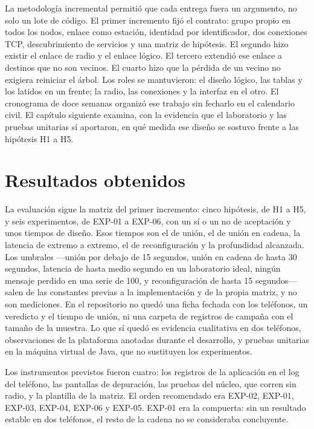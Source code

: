 \documentclass[12pt,oneside]{scrreprt}
\begin{document}
La metodología incremental permitió que cada entrega fuera un argumento, no solo un lote de código. El primer incremento fijó el contrato: grupo propio en todos los nodos, enlace como estación, identidad por identificador, dos conexiones TCP, descubrimiento de servicios y una matriz de hipótesis. El segundo hizo existir el enlace de radio y el enlace lógico. El tercero extendió ese enlace a destinos que no son vecinos. El cuarto hizo que la pérdida de un vecino no exigiera reiniciar el árbol. Los roles se mantuvieron: el diseño lógico, las tablas y los latidos en un frente; la radio, las conexiones y la interfaz en el otro. El cronograma de doce semanas organizó ese trabajo sin fecharlo en el calendario civil. El capítulo siguiente examina, con la evidencia que el laboratorio y las pruebas unitarias sí aportaron, en qué medida ese diseño se sostuvo frente a las hipótesis H1 a H5.

\chapter{Resultados obtenidos}
\label{ch:resultados}
La evaluación sigue la matriz del primer incremento: cinco hipótesis, de H1 a H5, y seis experimentos, de EXP-01 a EXP-06, con un sí o un no de aceptación y unos tiempos de diseño. Esos tiempos son el de unión, el de unión en cadena, la latencia de extremo a extremo, el de reconfiguración y la profundidad alcanzada. Los umbrales ---unión por debajo de 15 segundos, unión en cadena de hasta 30 segundos, latencia de hasta medio segundo en un laboratorio ideal, ningún mensaje perdido en una serie de 100, y reconfiguración de hasta 15 segundos--- salen de las constantes previas a la implementación y de la propia matriz, y no son mediciones. En el repositorio no quedó una ficha fechada con los teléfonos, un veredicto y el tiempo de unión, ni una carpeta de registros de campaña con el tamaño de la muestra. Lo que sí quedó es evidencia cualitativa en dos teléfonos, observaciones de la plataforma anotadas durante el desarrollo, y pruebas unitarias en la máquina virtual de Java, que no sustituyen los experimentos.

Los instrumentos previstos fueron cuatro: los registros de la aplicación en el log del teléfono, las pantallas de depuración, las pruebas del núcleo, que corren sin radio, y la plantilla de la matriz. El orden recomendado era EXP-02, EXP-01, EXP-03, EXP-04, EXP-06 y EXP-05. EXP-01 era la compuerta: sin un resultado estable en dos teléfonos, el resto de la cadena no se consideraba concluyente.
\end{document}
